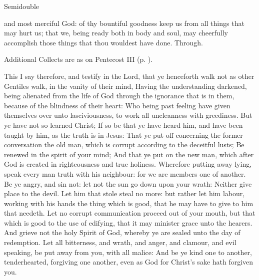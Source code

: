 \begin{inhead}
{Semidouble}
\end{inhead}

\collect
{} and most merciful God: of thy bountiful goodness keep us from all things that may hurt us; that we, being ready both in body and soul, may cheerfully accomplish those things that thou wouldest have done. Through.
\begin{rubric}
    Additional Collects are as on Pentecost III (p. \pageref{PentecostIII}).
\end{rubric}

 This I say therefore, and testify in the Lord, that ye henceforth walk not as other Gentiles walk, in the vanity of their mind, Having the understanding darkened, being alienated from the life of God through the ignorance that is in them, because of the blindness of their heart: Who being past feeling have given themselves over unto lasciviousness, to work all uncleanness with greediness. But ye have not so learned Christ; If so be that ye have heard him, and have been taught by him, as the truth is in Jesus: That ye put off concerning the former conversation the old man, which is corrupt according to the deceitful lusts;
%
Be renewed in the spirit of your mind; And that ye put on the new man, which after God is created in righteousness and true holiness. Wherefore putting away lying, speak every man truth with his neighbour: for we are members one of another. Be ye angry, and sin not: let not the sun go down upon your wrath: Neither give place to the devil. Let him that stole steal no more: but rather let him labour, working with his hands the thing which is good, that he may have to give to him that needeth.
%
Let no corrupt communication proceed out of your mouth, but that which is good to the use of edifying, that it may minister grace unto the hearers. And grieve not the holy Spirit of God, whereby ye are sealed unto the day of redemption. Let all bitterness, and wrath, and anger, and clamour, and evil speaking, be put away from you, with all malice: And be ye kind one to another, tenderhearted, forgiving one another, even as God for Christ's sake hath forgiven you.

